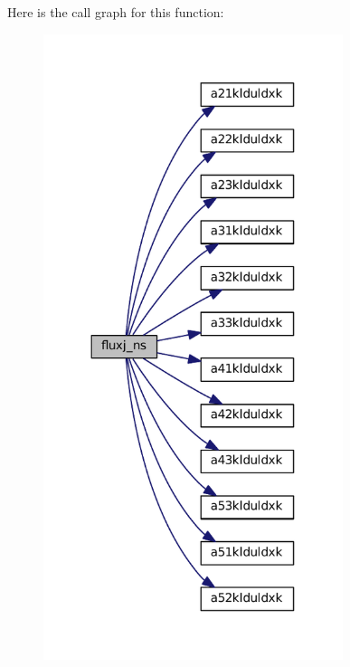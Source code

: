 Here is the call graph for this function\-:\nopagebreak
\begin{figure}[H]
\begin{center}
\leavevmode
\includegraphics[width=248pt]{group__vfjac_ga2c0d85531a9af69b9d464571ca530e5d_cgraph}
\end{center}
\end{figure}


